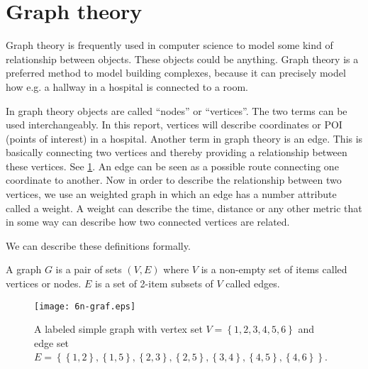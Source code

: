 \section{Graph theory}

Graph theory is frequently used in computer science to model some kind of relationship between objects. These objects could be anything. Graph theory is a preferred method to model building complexes, because it can precisely model how e.g. a hallway in a hospital is connected to a room.

In graph theory objects are called \enquote{nodes} or \enquote{vertices}. The two terms can be used interchangeably. In this report, vertices will describe coordinates or POI (points of interest) in a hospital. Another term in graph theory is an edge. This is basically connecting two vertices and thereby providing a relationship between these vertices. See \cref{fig:labeled_graph}. An edge can be seen as a possible route connecting one coordinate to another. Now in order to describe the relationship between two vertices, we use an weighted graph in which an edge has a number attribute called a weight. A weight can describe the time, distance or any other metric that in some way can describe how two connected vertices are related\cite{wiki_graph_glos,MIT2012}.

We can describe these definitions formally.\cite{MIT2012}
\begin{mydef}
	A graph $G$ is a pair of sets $(V,E)$ where $V$ is a non-empty set of items called vertices or nodes. $E$ is a set of 2-item subsets of $V$ called edges.
\end{mydef}

\begin{figure}[ht!]
    \centering
    \texttt{[image: 6n-graf.eps]}
    \caption{A labeled simple graph with vertex set $V = \left\{ {1, 2, 3, 4, 5, 6} \right\} $ and edge set $E = \left\{ \left\{ {1,2}\right\}, \left\{ {1,5}\right\}, \left\{ {2,3}\right\}, \left\{ {2,5}\right\}, \left\{ {3,4}\right\}, \left\{ {4,5} \right\} , \left\{ {4,6} \right\} \right\}$. \cite{wiki_graph_glos}}
    \label{fig:labeled_graph}
  \end{figure}

